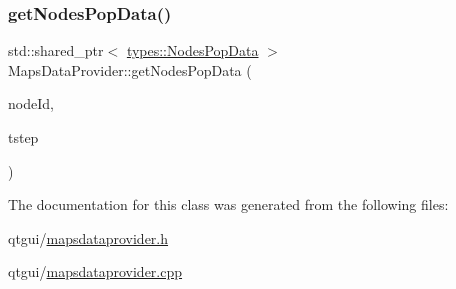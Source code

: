 \subsubsection{\texorpdfstring{getNodesPopData()}{getNodesPopData()}}
{\footnotesize\ttfamily std\+::shared\+\_\+ptr$<$ \mbox{\hyperlink{structtypes_1_1_nodes_pop_data}{types\+::\+Nodes\+Pop\+Data}} $>$ Maps\+Data\+Provider\+::get\+Nodes\+Pop\+Data (\begin{DoxyParamCaption}\item[{\mbox{\hyperlink{classtypes_1_1_node_id}{types\+::\+Node\+Id}}}]{node\+Id,  }\item[{\mbox{\hyperlink{namespacetypes_a9dc53a5ce11a196d82a6983030de8028}{types\+::tstep\+\_\+t}}}]{tstep }\end{DoxyParamCaption})}



The documentation for this class was generated from the following files\+:\begin{DoxyCompactItemize}
\item 
qtgui/\mbox{\hyperlink{mapsdataprovider_8h}{mapsdataprovider.\+h}}\item 
qtgui/\mbox{\hyperlink{mapsdataprovider_8cpp}{mapsdataprovider.\+cpp}}\end{DoxyCompactItemize}
